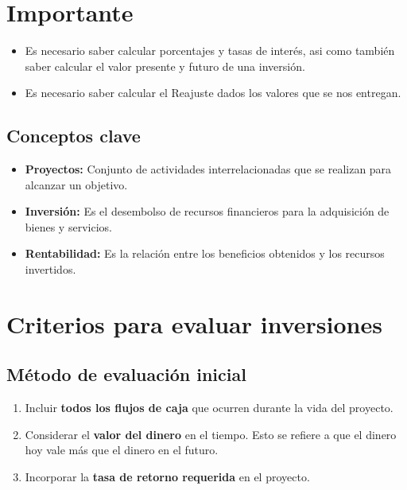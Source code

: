\documentclass{templateNote}
\begin{document}


\portada
\margenes 
\tableofcontents
\newpage

\section{Importante}

\begin{itemize}
    \item Es necesario saber calcular porcentajes y tasas de interés, asi como también saber calcular el valor presente y futuro de una inversión.
    \item Es necesario saber calcular el Reajuste dados los valores que se nos entregan.
\end{itemize}

\subsection{Conceptos clave}

\begin{itemize}
    \item \textbf{Proyectos:} Conjunto de actividades interrelacionadas que se realizan para alcanzar un objetivo.
    \item \textbf{Inversión:} Es el desembolso de recursos financieros para la adquisición de bienes y servicios.
    \item \textbf{Rentabilidad:} Es la relación entre los beneficios obtenidos y los recursos invertidos.
\end{itemize}

\newpage
\section{Criterios para evaluar inversiones}
\subsection*{Método de evaluación inicial}
\begin{enumerate}[label=\alph*)]
    \item Incluir \textbf{todos los flujos de caja} que ocurren durante la vida del proyecto.
    \item Considerar el \textbf{valor del dinero} en el tiempo. Esto se refiere a que el dinero hoy vale más que el dinero en el futuro.
    \item Incorporar la \textbf{tasa de retorno requerida} en el proyecto.
\end{enumerate}
\end{document}

